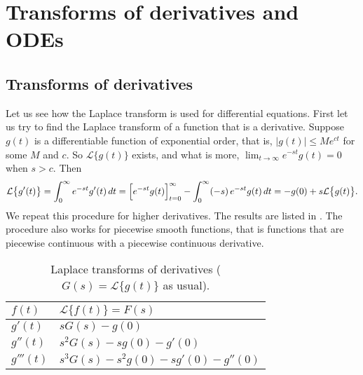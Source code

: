 \section{Transforms of derivatives and ODEs}
\label{transformsofders:section}





\subsection{Transforms of derivatives}

Let us see how the Laplace transform is used for differential equations.
First let us try to find the Laplace transform of a function that is a
derivative.  Suppose $g(t)$ is a differentiable function
of exponential order, that is, $\lvert g(t) \rvert \leq M e^{ct}$ for some
$M$ and $c$.  So $\mathcal{L} \bigl\{ g(t) \bigr\}$ exists, and what is more,
$\lim_{t\to\infty} e^{-st}g(t) = 0$ when $s > c$.  Then
\begin{equation*}
\mathcal{L} \bigl\{ g'(t) \bigr\}
=
\int_0^\infty
e^{-st}
g'(t) \,dt
=
\Bigl[e^{-st} g(t) \Bigr]_{t=0}^\infty
-
\int_0^\infty
(-s)\,
e^{-st}
g(t) \,dt
=
-g(0) + s \mathcal{L} \bigl\{ g(t) \bigr\} .
\end{equation*}
We repeat this procedure for higher derivatives.
The results are
listed in .  The procedure also works for piecewise
smooth functions, that is functions that are piecewise continuous with a
piecewise continuous derivative.

\begin{table}[h!t]
\mybeginframe
\capstart
\begin{center}
\begin{tabular}{@{}ll@{}}
\toprule
$f(t)$ & $\mathcal{L} \bigl\{ f(t) \bigr\} = F(s)$ \\
\midrule
$g'(t)$ & $sG(s)-g(0)$ \\[4pt]
$g''(t)$ & $s^2G(s)-sg(0)-g'(0)$ \\[4pt]
$g'''(t)$ & $s^3G(s)-s^2g(0)-sg'(0)-g''(0)$ \\[4pt]
\bottomrule
\end{tabular}
\end{center}
\caption{Laplace transforms of derivatives
($G(s) = \mathcal{L} \bigl\{ g(t) \bigr\}$
as usual).\label{ltd:table}}
\myendframe
\end{table}

